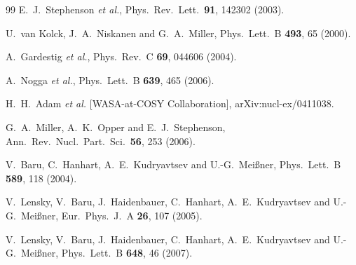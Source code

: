 \documentclass[aps,rmp,nofootinbib,twocolumn,floatfix]{revtex4}
\begin{document}
\begin{thebibliography}{99}
  E.~J.~Stephenson {\it et al.},
  Phys.\ Rev.\ Lett.\  {\bf 91}, 142302 (2003).

  U.~van Kolck, J.~A.~Niskanen and G.~A.~Miller,
  Phys.\ Lett.\  B {\bf 493}, 65 (2000).

  A.~Gardestig {\it et al.},
  Phys.\ Rev.\  C {\bf 69}, 044606 (2004).

  A.~Nogga {\it et al.},
  Phys.\ Lett.\  B {\bf 639}, 465 (2006).

  H.~H.~Adam {\it et al.}  [WASA-at-COSY Collaboration],
  arXiv:nucl-ex/0411038.

  G.~A.~Miller, A.~K.~Opper and E.~J.~Stephenson,
  Ann.\ Rev.\ Nucl.\ Part.\ Sci.\  {\bf 56}, 253 (2006).

  V.~Baru, C.~Hanhart, A.~E.~Kudryavtsev and U.-G.~Mei{\ss}ner,
  Phys.\ Lett.\  B {\bf 589}, 118 (2004).

  V.~Lensky, V.~Baru, J.~Haidenbauer, C.~Hanhart, A.~E.~Kudryavtsev and U.-G.~Mei{\ss}ner,
  Eur.\ Phys.\ J.\  A {\bf 26}, 107 (2005).

  V.~Lensky, V.~Baru, J.~Haidenbauer, C.~Hanhart, A.~E.~Kudryavtsev and U.-G.~Mei{\ss}ner,
  Phys.\ Lett.\  B {\bf 648}, 46 (2007).


\end{thebibliography}
\end{document}
